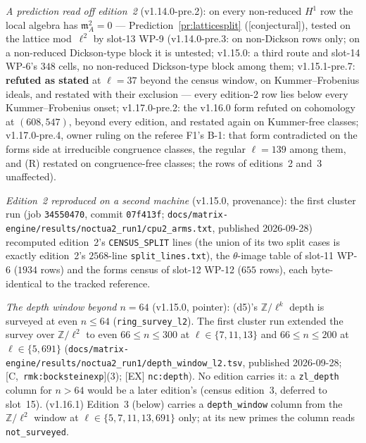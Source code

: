 \documentclass[11pt]{article}
\theoremstyle{remark}
\newcommand{\Z}{\mathbb{Z}}
\newcommand{\m}{\mathfrak{m}}
\newcommand{\HA}[1]{[C,~\texttt{#1}]}      %
\newcommand{\CONJ}{\textsf{[conjectural]}}
\begin{document}
\noindent\emph{A prediction read off edition~2} (v1.14.0-pre.2): on every non-reduced $H^1$ row the local algebra
has $\m_A^2=0$ --- Prediction~\ref{pr:latticesplit} (\CONJ), tested on the lattice mod~$\ell^2$ by slot-13 WP-9
(v1.14.0-pre.3: on non-Dickson rows only; on a non-reduced Dickson-type block it is untested; v1.15.0: a third route and
slot-14 WP-6's $348$ cells, no non-reduced Dickson-type block among them; v1.15.1-pre.7: \textbf{refuted as stated} at $\ell=37$
beyond the census window, on Kummer--Frobenius ideals, and restated with their exclusion --- every edition-2 row lies below every
Kummer--Frobenius onset; v1.17.0-pre.2: the v1.16.0 form refuted on cohomology at $(608,547)$, beyond every edition, and restated again on Kummer-free classes;
v1.17.0-pre.4, owner ruling on the referee F1's B-1: that form contradicted on the forms side at irreducible congruence classes, the regular $\ell=139$ among them,
and (R) restated on congruence-free classes; the rows of editions~2 and~3 unaffected).

\noindent\emph{Edition~2 reproduced on a second machine} (v1.15.0, provenance): the first cluster run (job \texttt{34550470}, commit
\texttt{07f413f}; \texttt{docs/matrix-engine/results/noctua2\_run1/cpu2\_arms.txt}, published 2026-09-28) recomputed edition~2's
\texttt{CENSUS\_SPLIT} lines (the union of its two split cases is exactly edition~2's $2568$-line \texttt{split\_lines.txt}), the
$\theta$-image table of slot-11 WP-6 ($1934$ rows) and the forms census of slot-12 WP-12 ($655$ rows), each byte-identical to the
tracked reference.

\noindent\emph{The depth window beyond $n=64$} (v1.15.0, pointer): (d5)'s $\Z/\ell^{k}$ depth is surveyed at even $n\le64$
(\texttt{ring\_survey\_l2}). The first cluster run extended the survey over $\Z/\ell^2$ to even $66\le n\le300$ at $\ell\in\{7,11,13\}$ and
$66\le n\le200$ at $\ell\in\{5,691\}$ (\texttt{docs/matrix-engine/results/noctua2\_run1/depth\_window\_l2.tsv}, published 2026-09-28;
\HA{rmk:bocksteinexp}(3); [EX] \texttt{nc:depth}). No edition carries it: a \texttt{zl\_depth} column for $n>64$ would be a later edition's
(census edition~3, deferred to slot~15). (v1.16.1) Edition~3 (below) carries a \texttt{depth\_window} column from the
$\Z/\ell^2$ window at $\ell\in\{5,7,11,13,691\}$ only; at its new primes the column reads \texttt{not\_surveyed}.
\end{document}
